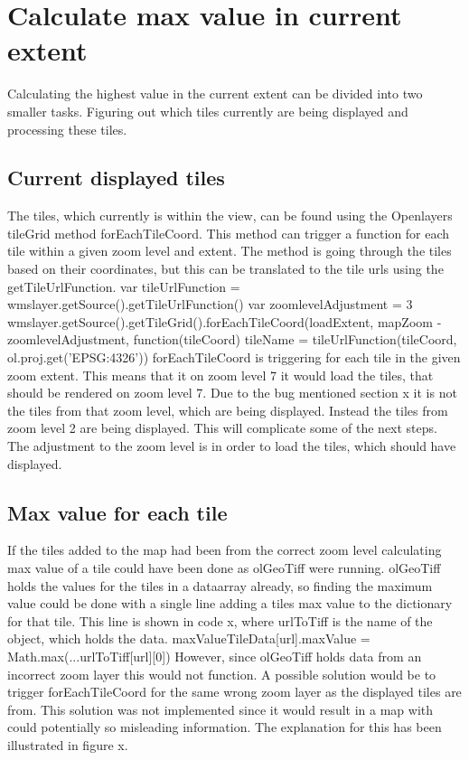 \section{Calculate max value in current extent}
Calculating the highest value in the current extent can be divided into two smaller tasks. Figuring out which tiles currently are being displayed and processing these tiles.

\subsection{Current displayed tiles}

The tiles, which currently is within the view, can be found using the Openlayers tileGrid method forEachTileCoord. This method can trigger a function for each tile within a given zoom level and extent. 
The method is going through the tiles based on their coordinates, but this can be translated to the tile urls using the getTileUrlFunction.
var tileUrlFunction = wmslayer.getSource().getTileUrlFunction()
var zoomlevelAdjustment = 3
wmslayer.getSource().getTileGrid().forEachTileCoord(loadExtent, mapZoom - zoomlevelAdjustment, function(tileCoord) {
tileName = tileUrlFunction(tileCoord, ol.proj.get('EPSG:4326'))
}
forEachTileCoord is triggering for each tile in the given zoom extent. This means that it on zoom level 7 it would load the tiles, that should be rendered on zoom level 7. Due to the bug mentioned section x it is not the tiles from that zoom level, which are being displayed. Instead the tiles from zoom level 2 are being displayed. This will complicate some of the next steps. 
The adjustment to the zoom level is in order to load the tiles, which should have displayed.

\subsection{Max value for each tile}
If the tiles added to the map had been from the correct zoom level calculating max value of a tile could have been done as olGeoTiff were running. olGeoTiff holds the values for the tiles in a dataarray already, so finding the maximum value could be done with a single line adding a tiles max value to the dictionary for that tile. This line is shown in code x, where urlToTiff is the name of the object, which holds the data.
        maxValueTileData[url].maxValue = Math.max(...urlToTiff[url][0])
However, since olGeoTiff holds data from an incorrect zoom layer this would not function. A possible solution would be to trigger forEachTileCoord for the same wrong zoom layer as the displayed tiles are from. This solution was not implemented since it would result in a map with could potentially so misleading information. The explanation for this has been illustrated in figure x. 

